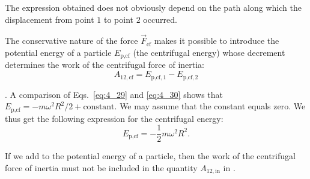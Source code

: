 \noindent
The expression obtained does not obviously depend on the path along which the displacement from point $1$ to point $2$ occurred.

The conservative nature of the force $\vec{F}_{\text{cf}}$ makes it possible to introduce the potential energy of a particle $E_{\text{p,cf}}$ (the centrifugal energy) whose decrement determines the work of the centrifugal force of inertia:
\begin{equation}\label{eq:4_30}
A_{12,\text{cf}} = E_{\text{p,cf},1} - E_{\text{p,cf},2}
\end{equation}

. A comparison of Eqs.~\eqref{eq:4_29} and \eqref{eq:4_30} shows that $E_{\text{p,cf}}=-m\omega^2R^2/2 + \text{constant}$. We may assume that the constant equals zero. We thus get the following expression for the centrifugal energy:
\begin{equation}\label{eq:4_31}
E_{\text{p,cf}} = -\frac{1}{2} m \omega^2 R^2.
\end{equation}

If we add  to the potential energy of a particle, then the work of the centrifugal force of inertia must not be included in the quantity $A_{12,\text{in}}$ in .
